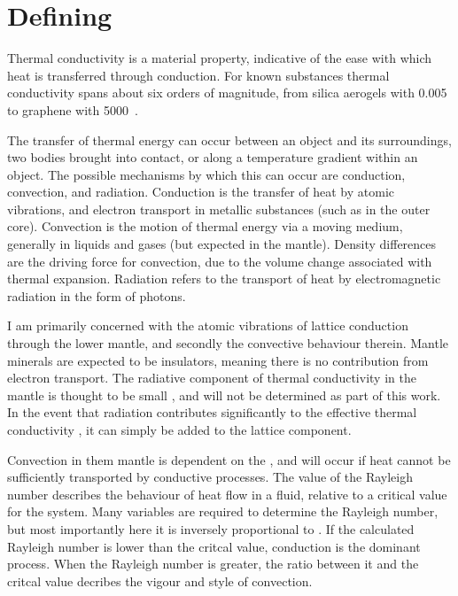 \section{Defining \tc}
\label{sec:defining_tc}

Thermal conductivity is a material property, indicative of the ease with which heat is transferred through conduction. For known substances thermal conductivity spans about six orders of magnitude, from silica aerogels with 0.005~\wmks \citep{Lee1995} to graphene with 5000~\wmks \citep{Balandin2008}.

The transfer of thermal energy can occur between an object and its surroundings, two bodies brought into contact, or along a temperature gradient within an object. The possible mechanisms by which this can occur are conduction, convection, and radiation. Conduction is the transfer of heat by atomic vibrations, and electron transport in metallic substances (such as in the outer core). Convection is the motion of thermal energy via a moving medium, generally in liquids and gases (but expected in the mantle). Density differences are the driving force for convection, due to the volume change associated with thermal expansion. Radiation refers to the transport of heat by electromagnetic radiation in the form of photons.

I am primarily concerned with the atomic vibrations of lattice conduction through the lower mantle, and secondly the convective behaviour therein. Mantle minerals are expected to be insulators, meaning there is no contribution from electron transport. The radiative component of thermal conductivity in the mantle is thought to be small \citep{Goncharov2008}, and will not be determined as part of this work. In the event that radiation contributes significantly to the effective thermal conductivity \citep{Keppler2008}, it can simply be added to the lattice component.

Convection in them mantle is dependent on the \tc, and will occur if heat cannot be sufficiently transported by conductive processes. The value of the Rayleigh number describes the behaviour of heat flow in a fluid, relative to a critical value for the system. Many variables are required to determine the Rayleigh number, but most importantly here it is inversely proportional to \tc. If the calculated Rayleigh number is lower than the critcal value, conduction is the dominant process. When the Rayleigh number is greater, the ratio between it and the critcal value decribes the vigour and style of convection.

